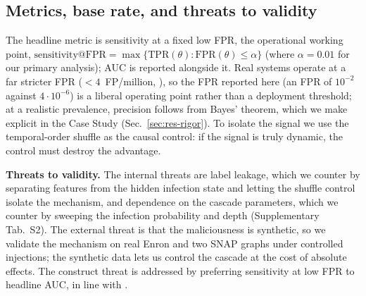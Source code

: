 \subsection{Metrics, base rate, and threats to validity}
\label{sec:m-metrics}
The headline metric is sensitivity at a fixed low FPR, the operational working point,
$\text{sensitivity}@\mathrm{FPR} = \max\{\mathrm{TPR}(\theta):\mathrm{FPR}(\theta)\le\alpha\}$ (where $\alpha=0.01$ for our primary analysis); AUC is reported
alongside it. Real systems operate at a far stricter FPR ($<\!4$~FP/million, \citep{ho2019detecting}), so the FPR
reported here (an FPR of $10^{-2}$ against $4\cdot10^{-6}$) is a liberal operating point rather than a
deployment threshold; at a realistic prevalence, precision
follows from Bayes' theorem, which we make explicit in the Case Study (Sec.~\ref{sec:res-rigor}). To isolate the
signal we use the temporal-order shuffle as the causal control: if the signal is truly dynamic, the control
must destroy the advantage.

\smallskip\noindent\textbf{Threats to validity.} The internal threats are label leakage, which we counter by
separating features from the hidden infection state and letting the shuffle control isolate the mechanism, and
dependence on the cascade parameters, which we counter by sweeping the infection probability and depth
(Supplementary Tab.~S2). The external threat is that the maliciousness is synthetic, so we validate the mechanism on
real Enron and two SNAP graphs under controlled injections; the synthetic data lets us control the cascade at
the cost of absolute effects. The construct threat is addressed by preferring sensitivity at low FPR to
headline AUC, in line with \citep{arp2022dos,pendlebury2019tesseract}.
